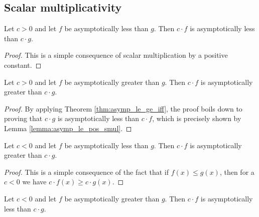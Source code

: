 \subsection{Scalar multiplicativity}

\begin{lemma}
    \label{lemma:asymp_le_pos_smul}
    \leanok
    Let $c > 0$ and let $f$ be asymptotically less than $g$. Then $c \cdot f$ is asymptotically
    less than $c \cdot g$.
\end{lemma}

\begin{proof}
    \leanok
    This is a simple consequence of scalar multiplication by a positive constant.
\end{proof}

\begin{lemma}
    \label{lemma:asymp_ge_pos_smul}
    \leanok
    Let $c > 0$ and let $f$ be asymptotically greater than $g$. Then $c \cdot f$ is asymptotically
    greater than $c \cdot g$.
\end{lemma}

\begin{proof}
    \leanok
    By applying Theorem \ref{thm:asymp_le_ge_iff}, the proof boils down to proving that
    $c \cdot g$ is asymptotically less than $c \cdot f$, which is precisely shown
    by Lemma \ref{lemma:asymp_le_pos_smul}.
\end{proof}

\begin{lemma}
    \label{lemma:asymp_le_neg_smul}
    \leanok
    Let $c < 0$ and let $f$ be asymptotically less than $g$. Then $c \cdot f$ is asymptotically
    greater than $c \cdot g$.
\end{lemma}

\begin{proof}
    \leanok
    This is a simple consequence of the fact that if $f(x) \le g(x)$, then for a $c < 0$
    we have $c \cdot f(x) \ge c \cdot g(x)$.
\end{proof}

\begin{lemma}
    \label{lemma:asymp_ge_neg_smul}
    \leanok
    Let $c < 0$ and let $f$ be asymptotically greater than $g$. Then $c \cdot f$ is asymptotically
    less than $c \cdot g$.
\end{lemma}


